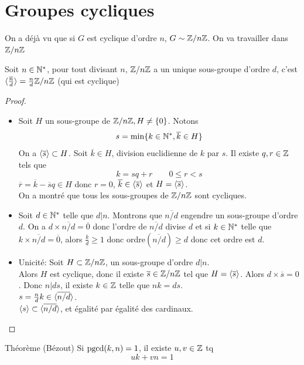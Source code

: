 \documentclass[]{report}
\begin{document}
\section{Groupes cycliques}

On a déjà vu que si $G$ est cyclique d'ordre $n$, $G\sim \mathbb{Z}/n\mathbb{Z}$. On va travailler dans $\mathbb{Z}/n\mathbb{Z}$

\begin{prop}{}{}
    Soit $n\in \mathbb{N}^*$, pour tout divisant $n$, $\mathbb{Z}/n\mathbb{Z}$ a un unique sous-groupe d'ordre $d$, c'est $\langle \frac{\overline{n}}{d} \rangle=\frac{n}{d}\mathbb{Z}/n\mathbb{Z}$ (qui est cyclique)
\end{prop}

\begin{proof}{}{}
    \begin{itemize}
        \item Soit $H$ un sous-groupe de $\mathbb{Z}/n\mathbb{Z},H\neq \{0\}$. Notons
        \[s=\min\{k\in \mathbb{N}^*,\overline{k}\in H\}\]
        On a $\langle \overline{s} \rangle\subset H$. Soit $\overline{k}\in H$, division euclidienne de $k$ par $s$. Il existe $q,r\in \mathbb{Z}$ tels que
        \[k=sq+r\qquad 0\le r<s\]
        $\overline{r}=\overline{k}-\overline{s}q\in H$ donc $r=0$, $\overline{k}\in \langle \overline{s} \rangle$ et $H= \langle \overline{s} \rangle$.\\
        On a montré que tous les sous-groupes de $\mathbb{Z}/n\mathbb{Z}$ sont cycliques.
        \item Soit $d\in \mathbb{N}^*$ telle que $d|n$. Montrons que $\overline{n/d}$ engendre un sous-groupe d'ordre $d$. On a $d\times \overline{n/d}=\overline{0}$ donc l'ordre de $\overline{n/d}$ divise $d$ et si $k\in \mathbb{N}^*$ telle que $k\times \overline{n/d}=\overline{0}$, alors $\frac{k}{d}\ge 1$ donc ordre$\left(\overline{n/d}\right)\ge d$ donc cet ordre est $d$.
        \item Unicité: Soit $H\subset \mathbb{Z}/n\mathbb{Z}$, un sous-groupe d'ordre $d|n$.\\
        Alors $H$ est cyclique, donc il existe $\overline{s}\in \mathbb{Z}/n\mathbb{Z}$ tel que $H=\langle \overline{s} \rangle$. Alors $d\times \overline{s}=0$. Donc $n|ds$, il existe $k\in \mathbb{Z}$ telle que $nk=ds$.\\
        $s=\frac{n}{d}k\in \langle \overline{n/d} \rangle$.\\
        $\langle s \rangle\subset \langle \overline{n/d} \rangle$, et égalité par égalité des cardinaux.
    \end{itemize}
\end{proof}

\begin{tm}{Théorème (Bézout)}{}
    Si $\text{pgcd}(k,n)=1$, il existe $u,v\in \mathbb{Z}$ tq
    \[uk+vn=1\]
\end{tm}
\end{document}
